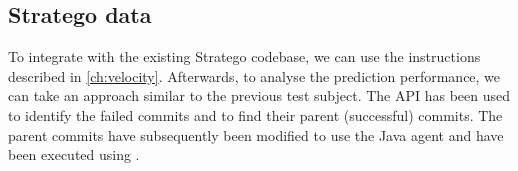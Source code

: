 
\subsection{Stratego data}
To integrate \velocity{} with the existing Stratego codebase, we can use the instructions described in \cref{ch:velocity}. Afterwards, to analyse the prediction performance, we can take an approach similar to the previous test subject. The \github{} API has been used to identify the failed commits and to find their parent (successful) commits. The parent commits have subsequently been modified to use the \velocity{} Java agent and have been executed using \githubactions{}.